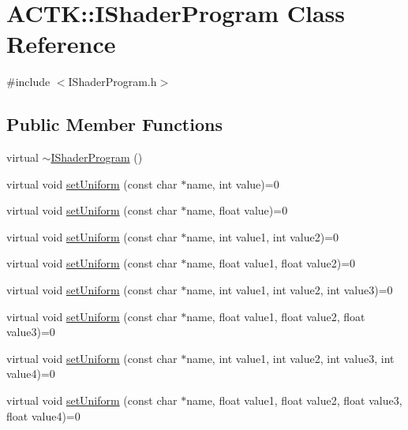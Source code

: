 \hypertarget{class_a_c_t_k_1_1_i_shader_program}{\section{A\-C\-T\-K\-:\-:I\-Shader\-Program Class Reference}
\label{class_a_c_t_k_1_1_i_shader_program}
}


{\ttfamily \#include $<$I\-Shader\-Program.\-h$>$}

\subsection*{Public Member Functions}
\begin{DoxyCompactItemize}
\item 
virtual \hyperlink{class_a_c_t_k_1_1_i_shader_program_abc6e7de5f538e095de9cc252fe2ad6f0}{$\sim$\-I\-Shader\-Program} ()
\item 
virtual void \hyperlink{class_a_c_t_k_1_1_i_shader_program_aca8f27202cb7a0af71c892e0d26b043d}{set\-Uniform} (const char $\ast$name, int value)=0
\item 
virtual void \hyperlink{class_a_c_t_k_1_1_i_shader_program_ab7658d25110c9d9411cbef9729183142}{set\-Uniform} (const char $\ast$name, float value)=0
\item 
virtual void \hyperlink{class_a_c_t_k_1_1_i_shader_program_a081ed5fd51cc790ccbedda67b6ad70be}{set\-Uniform} (const char $\ast$name, int value1, int value2)=0
\item 
virtual void \hyperlink{class_a_c_t_k_1_1_i_shader_program_a9e3488c2189c7e67d02ca220b3822a83}{set\-Uniform} (const char $\ast$name, float value1, float value2)=0
\item 
virtual void \hyperlink{class_a_c_t_k_1_1_i_shader_program_a7e968be2e8cfb2c81f6452cd5eee7cbe}{set\-Uniform} (const char $\ast$name, int value1, int value2, int value3)=0
\item 
virtual void \hyperlink{class_a_c_t_k_1_1_i_shader_program_af5431bd422db2bca7fcfdd2d8ef64b2d}{set\-Uniform} (const char $\ast$name, float value1, float value2, float value3)=0
\item 
virtual void \hyperlink{class_a_c_t_k_1_1_i_shader_program_a74d2bd2e5637ebe464063c4913e5595f}{set\-Uniform} (const char $\ast$name, int value1, int value2, int value3, int value4)=0
\item 
virtual void \hyperlink{class_a_c_t_k_1_1_i_shader_program_a8198e48ec198e4ac1e5bc8518c03aceb}{set\-Uniform} (const char $\ast$name, float value1, float value2, float value3, float value4)=0

\end{DoxyCompactItemize}
